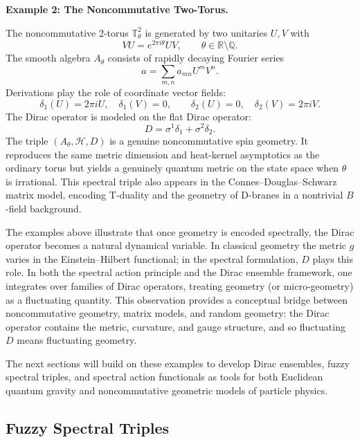 \documentclass[11pt]{article}
\theoremstyle{plain}
\begin{document}
\bigskip
\noindent\textbf{Example 2: The Noncommutative Two-Torus.}

\medskip
The noncommutative 2-torus $\mathbb{T}^{2}_{\theta}$ is generated by two unitaries $U,V$ with
\[
VU = e^{2\pi i \theta} U V, \qquad \theta\in\mathbb{R}\setminus\mathbb{Q}.
\]
The smooth algebra $A_{\theta}$ consists of rapidly decaying Fourier series
\[
a = \sum_{m,n} a_{mn} U^{m} V^{n}.
\]
Derivations play the role of coordinate vector fields:
\[
\delta_{1}(U)=2\pi i U,\quad \delta_{1}(V)=0,
\qquad
\delta_{2}(U)=0,\quad \delta_{2}(V)=2\pi i V.
\]
The Dirac operator is modeled on the flat Dirac operator:
\[
D = \sigma^{1}\delta_{1} + \sigma^{2}\delta_{2}.
\]
The triple $(A_{\theta},\mathcal{H},D)$ is a genuine noncommutative spin geometry.  It reproduces the
same metric dimension and heat-kernel asymptotics as the ordinary torus but yields a genuinely
quantum metric on the state space when $\theta$ is irrational.  This spectral triple also appears in the
Connes--Douglas--Schwarz matrix model, encoding T-duality and the geometry of D-branes in a
nontrivial $B$-field background.



\medskip
The examples above illustrate that once geometry is encoded spectrally, the Dirac operator becomes
a natural dynamical variable.  In classical geometry the metric $g$ varies in the Einstein--Hilbert
functional; in the spectral formulation, $D$ plays this role.  In both the spectral action principle and
the Dirac ensemble framework, one integrates over families of Dirac operators, treating geometry (or
micro-geometry) as a fluctuating quantity.  This observation provides a conceptual bridge between
noncommutative geometry, matrix models, and random geometry: the Dirac operator contains the
metric, curvature, and gauge structure, and so fluctuating $D$ means fluctuating geometry.

The next sections will build on these examples to develop Dirac ensembles, fuzzy spectral triples, and
spectral action functionals as tools for both Euclidean quantum gravity and noncommutative
geometric models of particle physics.



















\subsection{Fuzzy Spectral Triples}
\end{document}
